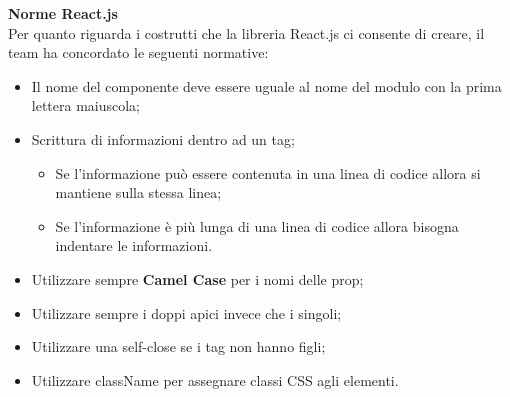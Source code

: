 \noindent \textbf{Norme React.js}\\
Per quanto riguarda i costrutti che la libreria React.js ci consente di creare, il team ha concordato le seguenti normative:
\begin{itemize}
    \item Il nome del componente deve essere uguale al nome del modulo con la prima lettera maiuscola;
    \item Scrittura di informazioni dentro ad un tag;
    \begin{itemize}
        \item Se l’informazione può essere contenuta in una linea di codice allora si mantiene sulla stessa
        linea;
        \item Se l’informazione è più lunga di una linea di codice allora bisogna indentare le informazioni.
    \end{itemize}
    \item Utilizzare sempre \textbf{Camel Case} per i nomi delle prop;
    \item Utilizzare sempre i doppi apici invece che i singoli;
    \item Utilizzare una self-close se i tag non hanno figli;
    \item Utilizzare className per assegnare classi CSS agli elementi.
\end{itemize}
\vspace{1em}

